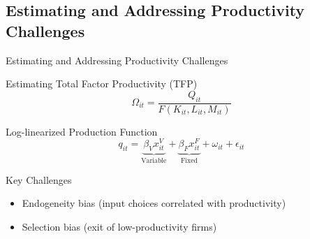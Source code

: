 \documentclass[aspectratio=169]{beamer}  %
\begin{document}
\subsection{Estimating and Addressing Productivity Challenges}
\begin{frame}{ Estimating and Addressing Productivity Challenges}
\begin{block}{Estimating Total Factor Productivity (TFP)}
    \begin{equation}
    \Omega_{it} = \frac{Q_{it}}{F(K_{it},L_{it},M_{it})}
    \end{equation}
\end{block}
\vspace{-1em} 
\begin{block}{Log-linearized Production Function}
    \begin{equation}
        q_{it} = \underbrace{\beta_V x_{it}^V}_{\text{Variable}} + \underbrace{\beta_F x_{it}^F}_{\text{Fixed}} + \omega_{it} + \epsilon_{it}
    \end{equation}
\end{block}
\vspace{-1em} 
    \begin{alertblock}{Key Challenges}
        \begin{itemize}
            \item Endogeneity bias (input choices correlated with productivity)
            \item Selection bias (exit of low-productivity firms)
        \end{itemize}
    \end{alertblock}
\end{frame}
\end{document}
